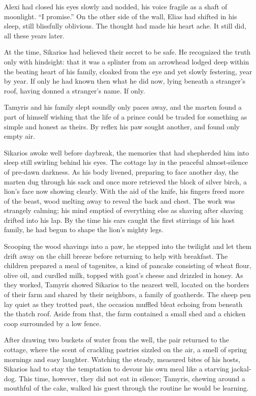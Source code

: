Alexi had closed his eyes slowly and nodded, his voice fragile as a shaft of moonlight. ``I promise.'' On the other side of the wall, Elias had shifted in his sleep, still blissfully oblivious. The thought had made his heart ache. It still did, all these years later.

At the time, Sikarios had believed their secret to be safe. He recognized the truth only with hindsight: that it was a splinter from an arrowhead lodged deep within the beating heart of his family, cloaked from the eye and yet slowly festering, year by year. If only he had known then what he did now, lying beneath a stranger's roof, having donned a stranger's name. If only.

Tamyris and his family slept soundly only paces away, and the marten found a part of himself wishing that the life of a prince could be traded for something as simple and honest as theirs. By reflex his paw sought another, and found only empty air.

\secdiv

\noindent Sikarios awoke well before daybreak, the memories that had shepherded him into sleep still swirling behind his eyes. The cottage lay in the peaceful almost-silence of pre-dawn darkness. As his body livened, preparing to face another day, the marten dug through his sack and once more retrieved the block of silver birch, a lion's face now showing clearly. With the aid of the knife, his fingers freed more of the beast, wood melting away to reveal the back and chest. The work was strangely calming; his mind emptied of everything else as shaving after shaving drifted into his lap. By the time his ears caught the first stirrings of his host family, he had begun to shape the lion's mighty legs.

Scooping the wood shavings into a paw, he stepped into the twilight and let them drift away on the chill breeze before returning to help with breakfast. The children prepared a meal of tagenites, a kind of pancake consisting of wheat flour, olive oil, and curdled milk, topped with goat's cheese and drizzled in honey. As they worked, Tamyris showed Sikarios to the nearest well, located on the borders of their farm and shared by their neighbors, a family of goatherds. The sheep pen lay quiet as they trotted past, the occasion muffled bleat echoing from beneath the thatch roof. Aside from that, the farm contained a small shed and a chicken coop surrounded by a low fence.

After drawing two buckets of water from the well, the pair returned to the cottage, where the scent of crackling pastries sizzled on the air, a smell of spring mornings and easy laughter. Watching the steady, measured bites of his hosts, Sikarios had to stay the temptation to devour his own meal like a starving jackal-dog. This time, however, they did not eat in silence; Tamyris, chewing around a mouthful of the cake, walked his guest through the routine he would be learning.

